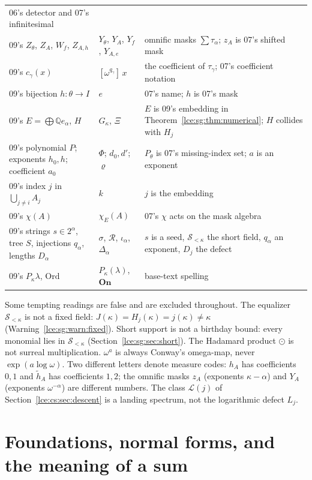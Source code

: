 \documentclass[11pt,letterpaper]{article}
\numberwithin{equation}{section}
\theoremstyle{definition}
\theoremstyle{remark}
\newcommand{\On}{\mathbf{On}}
\newcommand{\Q}{\mathbb Q}
\newcommand{\Sk}{\mathscr S_{<\kappa}}
\newcommand{\coef}[2]{[\omega^{#1}]\,#2}
\newcommand{\thref}[1]{Theorem~\ref{#1}}
\begin{document}
\begin{center}
\begin{longtable}{@{}P{0.23\textwidth}P{0.21\textwidth}P{0.49\textwidth}@{}}
06's detector and 07's infinitesimal\\
09's $Z_\theta$, $Z_A$, $W_f$, $Z_{A,h}$ & $Y_\theta$, $Y_A$, $Y_f$,
$Y_{A,e}$ & omnific masks $\sum\tau_\alpha$; $z_A$ is 07's shifted mask\\
09's $c_\gamma(x)$ & $\coef{q_\gamma}{x}$ & the coefficient of
$\tau_\gamma$; 07's coefficient notation\\
09's bijection $h:\theta\to I$ & $e$ & 07's name; $h$ is 07's mask\\
09's $E=\bigoplus\Q e_\alpha$, $H$ & $G_\kappa$, $\Xi$ & $E$ is 09's
embedding in \thref{lce:sg:thm:numerical}; $H$ collides with $H_j$\\
09's polynomial $P$; exponents $h_0,h$; coefficient $a_0$ & $\Phi$; $d_0,d'$;
$\varrho$ & $P_\theta$ is 07's missing-index set; $a$ is an exponent\\
09's index $j$ in $\bigcup_{j\ne i}A_j$ & $k$ & $j$ is the embedding\\
09's $\chi(A)$ & $\chi_E(A)$ & 07's $\chi$ acts on the mask algebra\\
09's strings $s\in2^\alpha$, tree $S$, injections $q_\alpha$, lengths
$D_\alpha$ & $\sigma$, $\mathcal R$, $\iota_\alpha$, $\Delta_\alpha$ & $s$ is a
seed, $\Sk$ the short field, $q_\alpha$ an exponent, $D_j$ the defect\\
09's $P_\kappa\lambda$, $\mathrm{Ord}$ & $P_\kappa(\lambda)$, $\On$ & base-text
spelling\\
\bottomrule
\end{longtable}
\end{center}

Some tempting readings are false and are excluded throughout. The equalizer
$\Sk$ is not a fixed field: $J(\kappa)=H_j(\kappa)=j(\kappa)\ne\kappa$
(Warning~\ref{lce:sg:warn:fixed}). Short support is not a birthday bound:
every monomial lies in $\Sk$ (Section~\ref{lce:sg:sec:short}). The
Hadamard product $\odot$ is not surreal multiplication. $\omega^a$ is always
Conway's omega-map, never $\exp(a\log\omega)$. Two different letters
denote measure codes: $h_A$ has coefficients $0,1$ and $\tilde h_A$ has
coefficients $1,2$; the omnific masks $z_A$ (exponents $\kappa-\alpha$) and
$Y_A$ (exponents $\omega^{-\alpha}$) are different numbers. The class
$\mathcal L(j)$ of Section~\ref{lce:cs:sec:descent} is a landing spectrum,
not the logarithmic defect $L_j$.

\section{Foundations, normal forms, and the meaning of a sum}\label{lce:sec:foundations}
\end{document}
